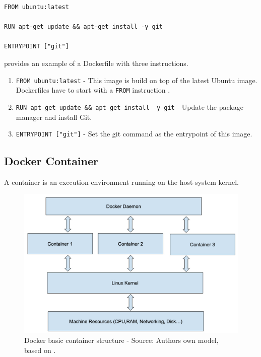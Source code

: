 \begin{lstlisting}[frame=single, label=lst:docker_dockerfile, caption=Example of a Dockerfile, captionpos=b]
FROM ubuntu:latest

RUN apt-get update && apt-get install -y git

ENTRYPOINT ["git"]
\end{lstlisting}

 provides an example of a Dockerfile with three instructions.
\begin{enumerate}
\item \texttt{FROM ubuntu:latest} - This image is build on top of the latest Ubuntu image. Dockerfiles have to start with a \texttt{FROM} instruction \cite{Nickoloff2019Docker}.
\item \texttt{RUN apt-get update \&\& apt-get install -y git} - Update the package manager and install Git.
\item \texttt{ENTRYPOINT ["git"]} - Set the git command as the entrypoint of this image.
\end{enumerate}



\subsection{Docker Container}
A container is an execution environment running on the host-system kernel.

\begin{figure}[h]%
\centering
\includegraphics[scale=0.8]{images/03_background/docker_basic_container_structure}%
\caption{Docker basic container structure - Source: Authors own model, based on \cite{Bullington2020Docker}.}%
\label{fig:docker_container_struct}%
\end{figure}

